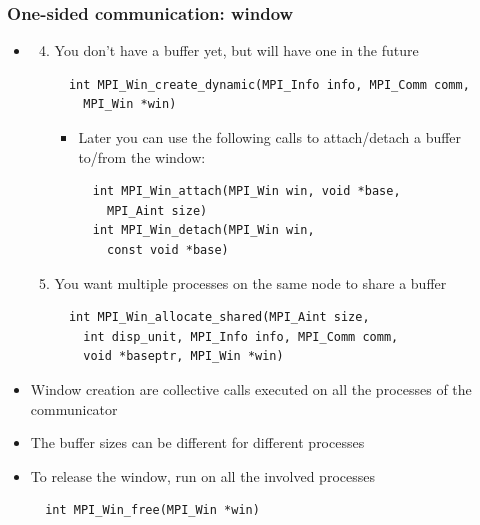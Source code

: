 \documentclass{beamer}
\begin{document}
\begin{frame}[fragile]
  \frametitle{One-sided communication: window}
\begin{itemize}
\item[]
\begin{enumerate}
\setcounter{enumi}{3}
\item You don’t have a buffer yet, but will have one in
the future
{\color{mycolorcode}
\begin{verbatim}
  int MPI_Win_create_dynamic(MPI_Info info, MPI_Comm comm, 
    MPI_Win *win)
\end{verbatim}
}
\begin{itemize}
\item Later you can use the following calls to attach/detach a buffer to/from the window:
{\color{mycolorcode}
\begin{verbatim}
  int MPI_Win_attach(MPI_Win win, void *base, 
    MPI_Aint size)
  int MPI_Win_detach(MPI_Win win, 
    const void *base)
\end{verbatim}
}
\end{itemize}
\item You want multiple processes on the same node
to share a buffer
{\color{mycolorcode}
\begin{verbatim}
  int MPI_Win_allocate_shared(MPI_Aint size, 
    int disp_unit, MPI_Info info, MPI_Comm comm, 
    void *baseptr, MPI_Win *win)
\end{verbatim}
}
\end{enumerate}

\item Window creation are collective calls executed on all the processes of the communicator
\item The buffer sizes can be different for different processes
\item To release the window, run on all the involved processes
{\color{mycolorcode}
\begin{verbatim}
  int MPI_Win_free(MPI_Win *win)
\end{verbatim}
}
\end{itemize}
\end{frame}
\end{document}

